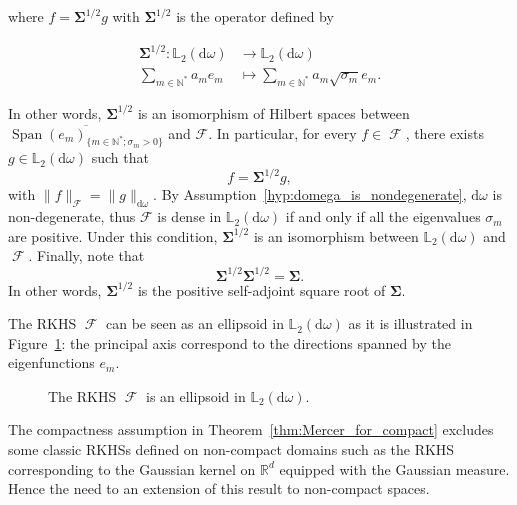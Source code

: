 \documentclass[twoside,11pt]{book}
\numberwithin{theorem}{chapter}
\numberwithin{definition}{chapter}
\numberwithin{proposition}{chapter}
\numberwithin{corollary}{chapter}
\numberwithin{example}{chapter}
\numberwithin{lemma}{chapter}
\numberwithin{assumption}{chapter}
\numberwithin{equation}{chapter}
\numberwithin{figure}{chapter}
\DeclareMathOperator{\Span}{\mathrm{Span}}
\DeclareMathOperator{\F}{\mathcal{F}}
\begin{document}
where $f = \bm{\Sigma}^{1/2}g$ with $\bm{\Sigma}^{1/2}$ is the operator defined by


\begin{align*}
\bm{\Sigma}^{1/2}: \mathbb{L}_{2}(\mathrm{d}\omega) & \longrightarrow \mathbb{L}_{2}(\mathrm{d}\omega) \\
 \sum\limits_{m \in \mathbb{N}^{*}} a_{m} e_m & \longmapsto \sum\limits_{m \in \mathbb{N}^{*}} a_m\sqrt{\sigma_{m}} e_{m}.
\end{align*}

 In other words, $\bm{\Sigma}^{1/2}$ is an isomorphism of Hilbert spaces between $\overline{\Span (e_{m})_{\{m \in \mathbb{N}^{*}; \sigma_m>0 \}}}$ and $\mathcal{F}$. In particular, for every $f \in \F$, there exists $g \in \mathbb{L}_{2}(\mathrm{d}\omega)$ such that
  \begin{equation}\label{eq:f_is_sigma_12_g}
  f = \bm{\Sigma}^{1/2}g,
  \end{equation}
  with $\|f\|_{\mathcal{F}} = \|g\|_{\mathrm{d}\omega}$. By Assumption~\ref{hyp:domega_is_nondegenerate}, $\mathrm{d}\omega$ is non-degenerate, thus $\mathcal{F}$ is dense in $\mathbb{L}_{2}(\mathrm{d}\omega)$ if and only if all the eigenvalues $\sigma_{m}$ are positive. Under this condition, $\bm{\Sigma}^{1/2}$ is an isomorphism between $\mathbb{L}_{2}(\mathrm{d}\omega)$ and $\F$. Finally, note that 
  \begin{equation}
  \bm{\Sigma}^{1/2} \bm{\Sigma}^{1/2} = \bm{\Sigma}.
  \end{equation}
  In other words, $\bm{\Sigma}^{1/2}$ is the positive self-adjoint square root of $\bm{\Sigma}$.


  The RKHS $\F$ can be seen as an ellipsoid in $\mathbb{L}_{2}(\mathrm{d}\omega)$ as it is illustrated in Figure~\ref{fig:rkhs_is_ellipsoid}: the principal axis correspond to the directions spanned by the eigenfunctions $e_{m}$.

\begin{figure}
    \centering
    \resizebox{0.6\textwidth}{!}{}
    \caption{The RKHS $\F$ is an ellipsoid in $\mathbb{L}_{2}(\mathrm{d}\omega)$. \label{fig:rkhs_is_ellipsoid}}
\end{figure}


The compactness assumption in Theorem~\ref{thm:Mercer_for_compact} excludes some classic RKHSs defined on non-compact domains such as the RKHS corresponding to the Gaussian kernel on $\mathbb{R}^{d}$ equipped with the Gaussian measure.
Hence the need to an extension of this result to non-compact spaces.
\end{document}
